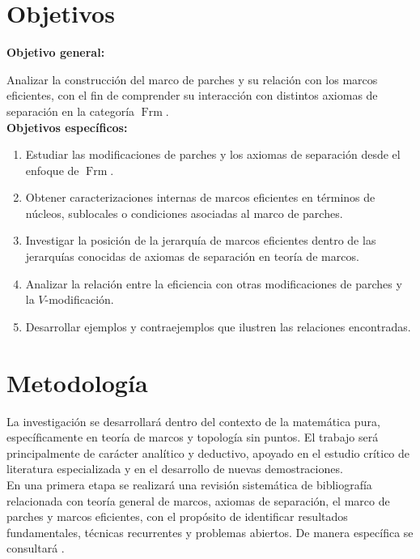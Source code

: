 \documentclass{protocol_template}
\DeclareMathOperator{\Frm}{Frm}
\begin{document}
\section{Objetivos}
\textbf{Objetivo general:}

Analizar la construcción del marco de parches y su relación con los marcos eficientes, con el fin de comprender su interacción con distintos axiomas de separación 
en la categoría $\Frm$.\\


\textbf{Objetivos específicos:}
\begin{enumerate}
\item Estudiar las modificaciones de parches y los axiomas de separación desde el enfoque de $\Frm$.
\item Obtener caracterizaciones internas de marcos eficientes en términos de núcleos, sublocales o condiciones asociadas al marco de parches.
\item Investigar la posición de la jerarquía de marcos eficientes dentro de las jerarquías conocidas de axiomas de separación en teoría de marcos.
\item Analizar la relación entre la eficiencia con otras modificaciones de parches y la $V$-modificación.
\item Desarrollar ejemplos y contraejemplos que ilustren las relaciones encontradas. 
\end{enumerate}
\section{Metodología}


La investigación se desarrollará dentro del contexto de la matemática pura, específicamente en teoría de marcos y topología sin puntos. El trabajo será principalmente de carácter 
analítico y deductivo, apoyado en el estudio crítico de literatura especializada y en el desarrollo de nuevas demostraciones.\\

En una primera etapa se realizará una revisión sistemática de bibliografía relacionada con teoría general de marcos, axiomas de separación, el marco de parches y marcos eficientes, con el propósito de identificar 
resultados fundamentales, técnicas recurrentes y problemas abiertos. De manera específica se consultará \cite{PicadoPultr,Johnstone82, picado2021separation,sexton2003point,Zaldivar2023, simmonscollection, simmonsbasics}.\\ 
\end{document}
